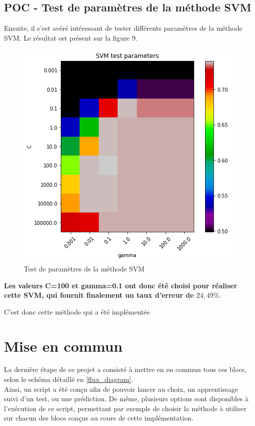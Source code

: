 \subsection{POC - Test de paramètres de la méthode SVM}

Ensuite, il s'est avéré intéressant de tester différents paramètres de la méthode SVM. Le résultat est présent sur la figure 9.

\begin{figure}[H]
	\centering
	\label{svm}
	\includegraphics{src/annexes/POC_FindStance_V2/output_24_0.png}
	\caption{Test de paramètres de la méthode SVM}
\end{figure}

\textbf{Les valeurs C=100 et gamma=0.1 ont donc été choisi pour réaliser cette SVM, qui fournit finalement un taux d'erreur de $24,49\%$}.

C'est donc cette méthode qui a été implémentée


\section{Mise en commun}
\par La dernière étape de ce projet a consisté à mettre en en commun tous ces blocs, selon le schéma détaillé en \ref{flux_diagram}.\\
Ainsi, un script a été conçu afin de pouvoir lancer au choix, un apprentissage suivi d'un test, ou une prédiction. De même, plusieurs options sont disponibles à l'exécution de ce script, permettant par exemple de choisir la méthode à utiliser sur chacun des blocs conçus au cours de cette implémentation.
